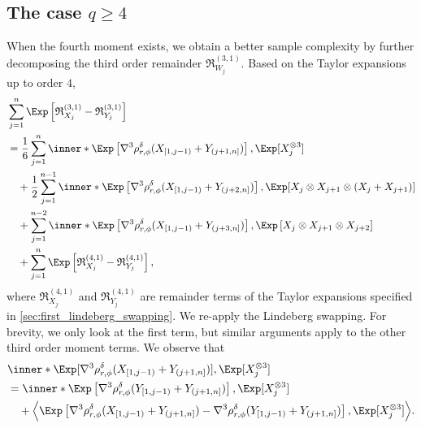 \documentclass[aos]{imsart}
\begin{document}
\subsection{\texorpdfstring{The case $q \geq 4$}{4 ≤ q}} \label{sec:pf_sketch_4N}

When the fourth moment exists, we  obtain a better sample complexity by further decomposing the third order remainder $\mathfrak{R}_{W_j}^{(3,1)}$. Based on the Taylor expansions up to order $4$, %
\begin{equation} \label{eq:decompose_third_remainder_N}
\begin{aligned}
    & \sum_{j=1}^{n} \Exp \left[  
        \mathfrak{R}_{X_j}^{(3,1)} 
        - \mathfrak{R}_{Y_j}^{(3,1)} 
    \right] \\
    & = \frac{1}{6} \sum_{j=1}^{n}  
        \inner*{ \Exp\left[ \nabla^3 \rho_{r,\phi}^\delta(X_{[1,j-1)} + Y_{(j+1,n]}) \right], \Exp[ X_j^{\otimes 3} ]} \\
    & \quad + \frac{1}{2} \sum_{j=1}^{n-1} \inner*{ 
        \Exp\left[ \nabla^3 \rho_{r,\phi}^\delta(X_{[1,j-1)} + Y_{(j+2,n]}) \right], 
        \Exp[ X_{j} \otimes X_{j+1} \otimes (X_j + X_{j+1})] 
    } \\
    & \quad + \sum_{j=1}^{n-2} \inner*{ 
        \Exp\left[ \nabla^3 \rho_{r,\phi}^\delta(X_{[1,j-1)} + Y_{(j+3,n]}) \right], 
        \Exp\left[ X_{j} \otimes X_{j+1} \otimes X_{j+2} \right]} \\
    & \quad + \sum_{j=1}^{n} \Exp \left[ \mathfrak{R}_{X_j}^{(4,1)} 
        - \mathfrak{R}_{Y_j}^{(4,1)} \right],
\end{aligned}
\end{equation}
where $\mathfrak{R}_{X_j}^{(4,1)}$ and $\mathfrak{R}_{Y_j}^{(4,1)}$ are remainder terms of the Taylor expansions specified in \cref{sec:first_lindeberg_swapping}.
We re-apply the Lindeberg swapping. For brevity, we only look at the first term, but similar arguments apply to the other third order moment terms. 
We observe that
\begin{equation} \label{eq:decompose_third_moment_N}
\begin{aligned}
    & \inner*{ 
        \Exp[ \nabla^3 \rho_{r,\phi}^\delta(X_{[1,j-1)} + Y_{(j+1,n]}) ], 
        \Exp[ X_j^{\otimes 3} ]
    } \\
    & = \inner*{ 
        \Exp\left[ \nabla^3 \rho_{r,\phi}^\delta(Y_{[1,j-1)} + Y_{(j+1,n]}) \right], 
        \Exp[ X_j^{\otimes 3} ]
    } \\
    & \quad + \Big\langle 
        \Exp\left[ \nabla^3 \rho_{r,\phi}^\delta(X_{[1,j-1)} + Y_{(j+1,n]}) 
        - \nabla^3 \rho_{r,\phi}^\delta(Y_{[1,j-1)} + Y_{(j+1,n]}) \right], 
        \Exp[ X_j^{\otimes 3} ]\Big\rangle.
\end{aligned}
\end{equation}
\end{document}
